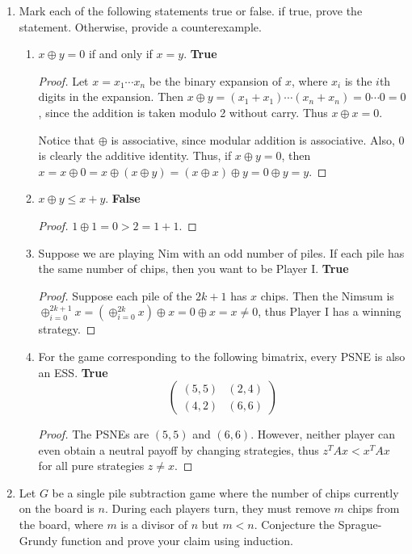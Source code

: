\documentclass[10pt]{article}
\begin{document}
\begin{enumerate}
\item Mark each of the following statements true or false.  if true, prove the statement.  Otherwise, provide a counterexample.
\begin{enumerate}
\item $x \oplus y = 0$ if and only if $x=y$.  \textbf{True}
\begin{proof}
  Let $x = x_1 \cdots x_n$ be the binary expansion of $x$, where $x_i$ is the $i$th digits in the expansion.  Then $x \oplus y = (x_1 + x_1) \cdots (x_n + x_n) = 0 \cdots 0 = 0$, since the addition is taken modulo 2 without carry.  Thus $x \oplus x = 0$.

Notice that $\oplus$ is associative, since modular addition is associative.  Also, $0$ is clearly the additive identity.  Thus, if $x \oplus y = 0$, then $x = x \oplus 0 = x \oplus (x \oplus y) = (x \oplus x) \oplus y = 0 \oplus y = y$.
\end{proof}
\item $x \oplus y \leq x + y$. \textbf{False}
\begin{proof}
$1 \oplus 1 = 0 > 2 = 1 + 1$.
\end{proof}
\item Suppose we are playing Nim with an odd number of piles. If each pile has the same number of chips, then you want to be Player I. \textbf{True}
\begin{proof}
Suppose each pile of the $2k+1$ has $x$ chips.  Then the Nimsum is $\oplus_{i=0}^{2k+1} x = (\oplus_{i=0}^{2k} x) \oplus x = 0 \oplus x = x \neq 0$, thus Player I has a winning strategy.
\end{proof}
\item For the game corresponding to the following bimatrix, every PSNE is also an ESS. \textbf{True}
$$
\begin{pmatrix}
(5,5) & (2,4) \\
(4,2) & (6,6)
\end{pmatrix}
$$
\begin{proof}
The PSNEs are $(5,5)$ and $(6,6)$.  However, neither player can even obtain a neutral payoff by changing strategies, thus $z^T A x < x^T A x$ for all pure strategies $z \neq x$.
\end{proof}
\end{enumerate}
\item Let $G$ be a single pile subtraction game where the number of chips currently on the board is $n$. During each players turn, they must remove $m$ chips from the board, where $m$ is a divisor of $n$ but $m < n$. Conjecture the Sprague-Grundy function and prove your claim using induction.


\end{enumerate}
\end{document}
